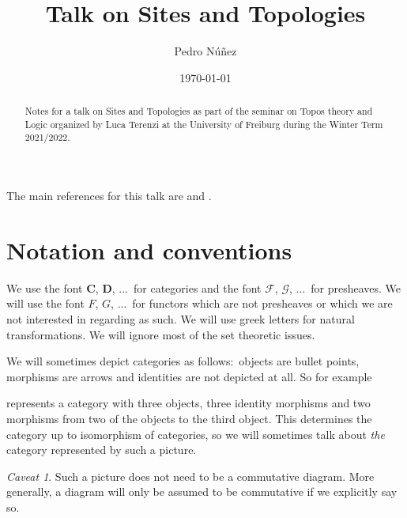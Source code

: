 \documentclass[12pt,reqno,a4paper]{amsart}
\title[Talk on Sites and Topologies]{Talk on Sites and Topologies}
\author[Pedro N\'{u}\~{n}ez]{Pedro N\'{u}\~{n}ez}
\date{\today}
\theoremstyle{plain}
\theoremstyle{definition}
\theoremstyle{remark}
\newtheorem{cav}{Caveat}
\begin{document}
\maketitle

\begin{abstract}
  Notes for a talk on Sites and Topologies as part of the seminar on Topos theory and Logic organized by Luca Terenzi at the University of Freiburg during the Winter Term 2021/2022.
\end{abstract}

\tableofcontents


The main references for this talk are \cite{sga4} and \cite{stacks-project}.

\setcounter{section}{-1}

\section{Notation and conventions}

We use the font $\mathbf{C}$, $\mathbf{D}$, ...~for categories and the font $\mathscr{F}$, $\mathscr{G}$, ...~for presheaves.
We will use the font $F$, $G$, ...~for functors which are not presheaves or which we are not interested in regarding as such.
We will use greek letters for natural transformations.
We will ignore most of the set theoretic issues.

We will sometimes depict categories as follows:~objects are bullet points, morphisms are arrows and identities are not depicted at all.
So for example
\begin{center}
\end{center}
represents a category with three objects, three identity morphisms and two morphisms from two of the objects to the third object.
This determines the category up to isomorphism of categories, so we will sometimes talk about \textit{the} category represented by such a picture.

\begin{cav}
  Such a picture does not need to be a commutative diagram.
  More generally, a diagram will only be assumed to be commutative if we explicitly say so.
\end{cav}
\end{document}
